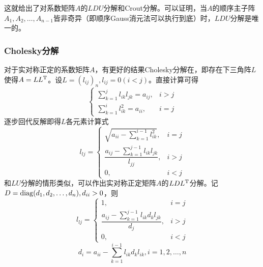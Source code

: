 \documentclass[UTF8,a4paper,10pt]{ctexart}
\begin{document}
                这就给出了对系数矩阵$A$的$LDU$分解和Crout分解。可以证明，当$A$的顺序主子阵$A_1,A_2,\dots,A_{n-1}$皆非奇异（即顺序Gauss消元法可以执行到底）时，$LDU$分解是唯一的。
            \subsubsection{Cholesky分解}
                \par
                对于实对称正定的系数矩阵$A$，有更好的结果Cholesky分解在，即存在下三角阵$L$使得$A=LL^{\rm T}$。设$L=(l_{ij})_n,l_{ij}=0(i<j)$。直接计算可得
                $$
                    \begin{cases}
                        \sum_{k=1}^jl_{ik}l_{jk}=a_{ij}, & i>j \\
                        \sum_{k=1}^il_{ik}^2=a_{ii}, & i=j
                    \end{cases}
                $$
                逐步回代反解即得$L$各元素计算式
                $$
                l_{lj}=
                    \begin{cases}
                        \sqrt{a_{ii}-\sum_{k=1}^{i-1}l_{ik}^2}, & i=j \\
                        \dfrac{a_{ij}-\sum_{k=1}^{j-1}l_{ik}l_{jk}}{l_{jj}}, & i>j \\
                        0, & i<j
                    \end{cases}
                $$
                和$LU$分解的情形类似，可以作出实对称正定矩阵$A$的$LDL^{\rm T}$分解。记$D={\rm diag}(d_1,d_2,\dots,d_n),d_{ii}>0$，则
                $$
                l_{lj}=
                    \begin{cases}
                        1, & i=j \\
                        \dfrac{a_{ij}-\sum_{k=1}^{j-1}l_{ik}d_kl_{jk}}{d_{j}}, & i>j \\
                        0, & i<j
                    \end{cases}
                $$
                $$
                d_i=a_{ii}-\sum_{k=1}^{i-1}l_{ik}d_kl_{ik},i=1,2,\dots,n
                $$
\end{document}
